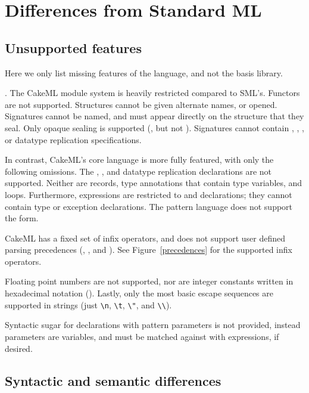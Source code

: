 \documentclass[12pt,a4paper]{book}
\begin{document}
\section{Differences from Standard ML}

\subsection{Unsupported features}
Here we only list missing features of the language, and not the basis library.

.
The CakeML module system is heavily restricted compared to SML's. Functors are not supported. Structures cannot be given alternate names, or opened. Signatures cannot be named, and must appear directly on the structure that they seal. Only opaque sealing is supported (\smlinline{:>}, but not \smlinline{:}). Signatures cannot contain , , ,  or datatype replication specifications.

In contrast, CakeML's core language is more fully featured, with only the following omissions. The , , and datatype replication declarations are not supported. Neither are records, type annotations that contain type variables, and  loops. Furthermore,  expressions are restricted to  and  declarations; they cannot contain type or exception declarations. The pattern language does not support the  form.

CakeML has a fixed set of infix operators, and does not support user defined parsing precedences (, , and ). See Figure~\ref{precedences} for the supported infix operators.

Floating point numbers are not supported, nor are integer constants written in hexadecimal notation (). Lastly, only the most basic escape sequences are supported in strings (just \texttt{\textbackslash n}, \texttt{\textbackslash t}, \texttt{\textbackslash "}, and \texttt{\textbackslash\textbackslash}).

Syntactic sugar for  declarations with pattern parameters is not provided, instead parameters are variables, and must be matched against with  expressions, if desired.

\subsection{Syntactic and semantic differences}
\end{document}
